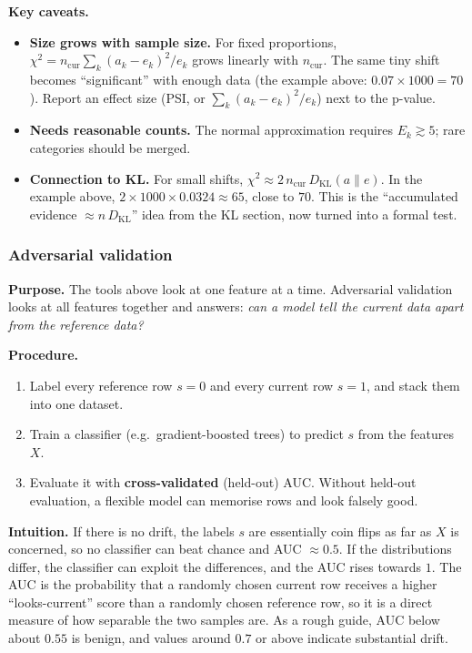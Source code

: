 \documentclass[11pt]{article}
\begin{document}
\textbf{Key caveats.}
\begin{itemize}
    \item \textbf{Size grows with sample size.} For fixed proportions, \(\chi^2=n_{\text{cur}}\sum_k(a_k-e_k)^2/e_k\) grows linearly with \(n_{\text{cur}}\). The same tiny shift becomes ``significant'' with enough data (the example above: \(0.07\times1000=70\)). Report an effect size (PSI, or \(\sum_k(a_k-e_k)^2/e_k\)) next to the p-value.
    \item \textbf{Needs reasonable counts.} The normal approximation requires \(E_k\gtrsim5\); rare categories should be merged.
    \item \textbf{Connection to KL.} For small shifts, \(\chi^2\approx2\,n_{\text{cur}}\,D_{\mathrm{KL}}(a\|e)\). In the example above, \(2\times1000\times0.0324\approx65\), close to \(70\). This is the ``accumulated evidence \(\approx n\,D_{\mathrm{KL}}\)'' idea from the KL section, now turned into a formal test.
\end{itemize}

\subsubsection{Adversarial validation}

\textbf{Purpose.} The tools above look at one feature at a time. Adversarial validation looks at all features together and answers: \emph{can a model tell the current data apart from the reference data?}

\textbf{Procedure.}
\begin{enumerate}
    \item Label every reference row \(s=0\) and every current row \(s=1\), and stack them into one dataset.
    \item Train a classifier (e.g.\ gradient-boosted trees) to predict \(s\) from the features \(X\).
    \item Evaluate it with \textbf{cross-validated} (held-out) AUC. Without held-out evaluation, a flexible model can memorise rows and look falsely good.
\end{enumerate}

\textbf{Intuition.} If there is no drift, the labels \(s\) are essentially coin flips as far as \(X\) is concerned, so no classifier can beat chance and AUC \(\approx0.5\). If the distributions differ, the classifier can exploit the differences, and the AUC rises towards \(1\). The AUC is the probability that a randomly chosen current row receives a higher ``looks-current'' score than a randomly chosen reference row, so it is a direct measure of how separable the two samples are. As a rough guide, AUC below about \(0.55\) is benign, and values around \(0.7\) or above indicate substantial drift.
\end{document}
